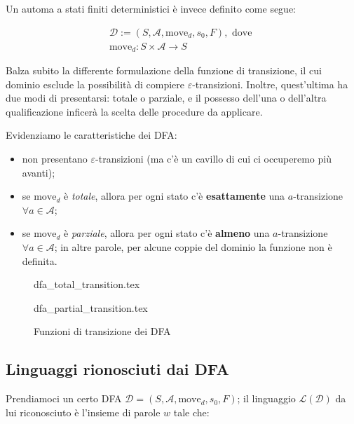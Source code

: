 \documentclass[class=book, crop=false, oneside, 12pt]{standalone}
\begin{document}
Un automa a stati finiti deterministici è invece definito come segue:

\begin{gather}
    \mathcal{D} := (S, \mathcal{A}, \textrm{move}_d, s_0, F), \textrm{ dove } \\
    \textrm{move}_d : S \times \mathcal{A} \to S
\end{gather}

Balza subito la differente formulazione della funzione di transizione, il cui dominio esclude la possibilità di compiere \(\varepsilon\)-transizioni. Inoltre, quest'ultima ha due modi di presentarsi: totale o parziale, e il possesso dell'una o dell'altra qualificazione inficerà la scelta delle procedure da applicare.

Evidenziamo le caratteristiche dei DFA:

\begin{itemize}
    \item non presentano \(\varepsilon\)-transizioni (ma c'è un cavillo di cui ci occuperemo più avanti);
    \item se \(\textrm{move}_d\) è \emph{totale}, allora per ogni stato c'è \textbf{esattamente} una \(a\)-transizione \(\forall a \in \mathcal{A}\);
    \item se \(\textrm{move}_d\) è \emph{parziale}, allora per ogni stato c'è \textbf{almeno} una \(a\)-transizione \(\forall a \in \mathcal{A}\); in altre parole, per alcune coppie del dominio la funzione non è definita.
\end{itemize}

\begin{figure}[H]
    \begin{minipage}[b]{0.4\textwidth}
        \centering
        {dfa_total_transition.tex}
    \end{minipage}
    \hfill
    \begin{minipage}[b]{0.4\textwidth}
        \centering
        {dfa_partial_transition.tex}
    \end{minipage}
    \caption{Funzioni di transizione dei DFA}
\end{figure}

\subsection{Linguaggi rionosciuti dai DFA}
Prendiamoci un certo DFA \(\mathcal{D} = (S, \mathcal{A}, \textrm{move}_d, s_0, F)\); il linguaggio \(\mathcal{L(D)}\) da lui riconosciuto è l'insieme di parole \(w\) tale che:
\end{document}
